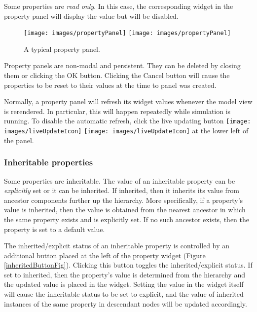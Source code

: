 \documentclass{article}
\begin{document}
Some properties are {\it read only}. In this case, the corresponding
widget in the property panel will display the value but will be
disabled.

\begin{figure}[h]
\begin{center}
\iflatexml
\texttt{[image: images/propertyPanel]}
\else
\texttt{[image: images/propertyPanel]}
\fi
\end{center}
\caption{A typical property panel.}%
\label{propertyPanelFig}
\end{figure}

Property panels are non-modal and persistent. 
They can be deleted by
closing them or clicking the {\sf OK} button. Clicking the {\sf Cancel} button
will cause the properties to be reset to their values at the time to
panel was created.

Normally, a property panel will refresh its widget values whenever the
model view is rerendered. In particular, this will happen repeatedly
while simulation is running. To disable the automatic refresh, click
the {\sf live updating} button 
\iflatexml
\texttt{[image: images/liveUpdateIcon]}
\else
\texttt{[image: images/liveUpdateIcon]}
\fi
at the lower
left of the panel.

\subsubsection{Inheritable properties}

Some properties are inheritable. The value of an inheritable property
can be {\it explicitly} set or it can be inherited.  If inherited, then it
inherits its value from ancestor components further up the hierarchy.
More specifically, if a property's value is inherited, then the value
is obtained from the nearest ancestor in which the same property
exists and is explicitly set.  If no such ancestor exists, then the
property is set to a default value.

The inherited/explicit status of an inheritable property is controlled
by an additional button placed at the left of the property widget
(Figure \ref{inheritedButtonFig}).  Clicking this button toggles the
inherited/explicit status.  If set to inherited, then the property's
value is determined from the hierarchy and the updated value is placed
in the widget.  Setting the value in the widget itself will cause the
inheritable status to be set to explicit, and the value of inherited
instances of the same property in descendant nodes will be updated
accordingly.
\end{document}
